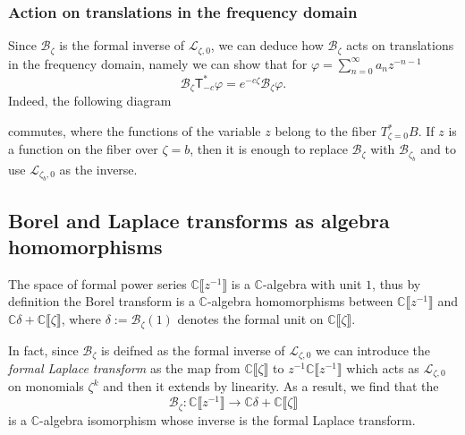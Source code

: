 \documentclass{article}
\newcommand{\C}{\mathbb{C}}
\newcommand{\laplace}{\mathcal{L}}
\newcommand{\borel}{\mathcal{B}}
\theoremstyle{definition}
\theoremstyle{plain}
\begin{document}
\subsubsection{Action on translations in the frequency domain}
Since $\borel_\zeta$ is the formal inverse of $\laplace_{\zeta,0}$, we can deduce how $\borel_\zeta$ acts on translations in the frequency domain, namely we can show that for $\varphi=\sum_{n=0}^\infty a_n z^{-n-1}$
\[\borel_\zeta \mathsf{T}_{-c}^* \varphi=e^{-c\zeta }\borel_\zeta\varphi.\]
Indeed, the following diagram
\begin{center}
\end{center}
commutes, where the functions of the variable $z$ belong to the fiber $T^*_{\zeta=0}B$. If $z$ is a function on the fiber over $\zeta=b$, then it is enough to replace $\borel_\zeta$ with $\borel_{\zeta_b}$ and to use  $\laplace_{\zeta_b,0}$ as the inverse. 
\subsection{Borel and Laplace transforms as algebra homomorphisms}\label{sec:borel-laplace-homom}
The space of formal power series $\C\llbracket z^{-1}\rrbracket$ is a $\C$-algebra with unit $1$, thus by definition the Borel transform is a $\C$-algebra homomorphisms between $\C\llbracket z^{-1}\rrbracket$ and $\C\delta +\C\llbracket\zeta\rrbracket$, where $\delta:=\borel_\zeta (1)$ denotes the formal unit on $\C\llbracket\zeta\rrbracket$. 

In fact, since $\borel_\zeta$ is deifned as the formal inverse of $\laplace_{\zeta,0}$ we can introduce the \textit{formal Laplace transform} as the map from $\C\llbracket \zeta\rrbracket$ to $z^{-1}\C\llbracket z^{-1}\rrbracket$ which acts as $\laplace_{\zeta,0}$ on monomials $\zeta^k$ and then it extends by linearity. As a result, we find that the \[\borel_\zeta\colon\C\llbracket z^{-1}\rrbracket\to\C\delta + \C\llbracket\zeta\rrbracket\] 
is a $\C$-algebra isomorphism whose inverse is the formal Laplace transform.
\end{document}
